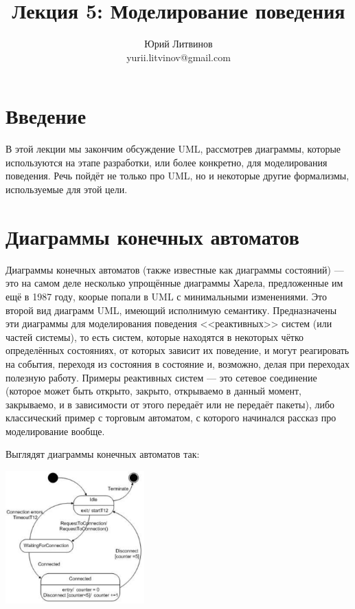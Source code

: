 \documentclass[a5paper]{article}
\title{Лекция 5:  Моделирование поведения}
\author{Юрий Литвинов\\\small{yurii.litvinov@gmail.com}}
\date{}
\begin{document}
\maketitle
\thispagestyle{empty}

\section{Введение}

В этой лекции мы закончим обсуждение UML, рассмотрев диаграммы, которые используются на этапе разработки, или более конкретно, для моделирования поведения. Речь пойдёт не только про UML, но и некоторые другие формализмы, используемые для этой цели.

\section{Диаграммы конечных автоматов}

Диаграммы конечных автоматов (также известные как диаграммы состояний) --- это на самом деле несколько упрощённые диаграммы Харела, предложенные им ещё в 1987 году, коорые попали в UML с минимальными изменениями. Это второй вид диаграмм UML, имеющий исполнимую семантику. Предназначены эти диаграммы для моделирования поведения <<реактивных>> систем (или частей системы), то есть систем, которые находятся в некоторых чётко определённых состояниях, от которых зависит их поведение, и могут реагировать на события, переходя из состояния в состояние и, возможно, делая при переходах полезную работу. Примеры реактивных систем --- это сетевое соединение (которое может быть открыто, закрыто, открываемо в данный момент, закрываемо, и в зависимости от этого передаёт или не передаёт пакеты), либо классический пример с торговым автоматом, с которого начинался рассказ про моделирование вообще.

Выглядят диаграммы конечных автоматов так:

\begin{center}
    \includegraphics[width=0.4\textwidth]{stateTransitionExample.png}
\end{center}
\end{document}
